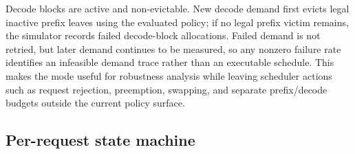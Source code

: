 \documentclass[11pt]{article}
\begin{document}
Decode blocks are active and non-evictable.  New decode demand first evicts legal
inactive prefix leaves using the evaluated policy; if no legal prefix victim remains,
the simulator records failed decode-block allocations.  Failed demand is not retried,
but later demand continues to be measured, so any nonzero failure rate identifies an
infeasible demand trace rather than an executable schedule.  This makes the mode useful
for robustness analysis while leaving scheduler actions such as request rejection,
preemption, swapping, and separate prefix/decode budgets outside the current policy
surface.

\subsection{Per-request state machine}
\end{document}
